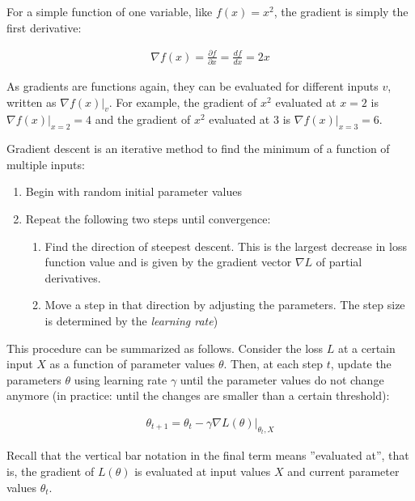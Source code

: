 For a simple function of one variable, like $f(x) = x^2$, the gradient is simply the first derivative:

\begin{align*}
\nabla f(x) = \frac{\partial f}{\partial x} = \frac{d f}{d x} = 2x 
\end{align*}

As gradients are functions again, they can be evaluated for different inputs $v$, written as $\nabla f(x) \rvert_{v}$. For example, the gradient of $x^2$ evaluated at $x=2$ is $\nabla f(x) \rvert_{x=2} = 4$ and the gradient of $x^2$ evaluated at $3$ is $\nabla f(x) \rvert_{x=3} = 6$.

\begin{samepage}
\noindent Gradient descent is an iterative method to find the minimum of a function of multiple inputs:
\begin{enumerate}
   \item Begin with random initial parameter values
   \item Repeat the following two steps until convergence:
   \begin{enumerate}
      \item Find the direction of steepest descent. This is the largest decrease in loss function value and is given by the gradient vector $\nabla L$ of partial derivatives.
      \item Move a step in that direction by adjusting the parameters. The step size is determined by the \emph{learning rate})
   \end{enumerate}
\end{enumerate}
\end{samepage}

This procedure can be summarized as follows. Consider the loss $L$ at a certain input $X$ as a function of parameter values $\theta$. Then, at each step $t$, update the parameters $\theta$ using learning rate $\gamma$ until the parameter values do not change anymore (in practice: until the changes are smaller than a certain threshold):

\begin{align}
\theta_{t+1} = \theta_t - \gamma \nabla L(\theta) \rvert_{\theta_t, X} \label{eq:gradientupdate}
\end{align}

Recall that the vertical bar notation in the final term means ''evaluated at'', that is, the gradient of $L(\theta)$ is evaluated at input values $X$ and current parameter values $\theta_t$.

